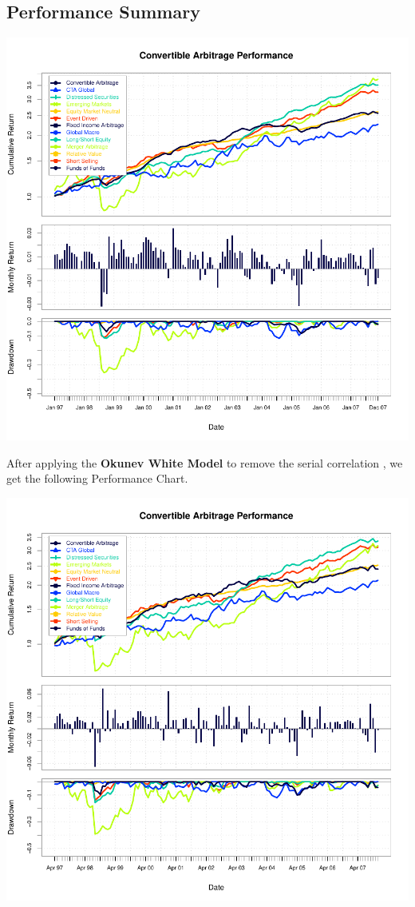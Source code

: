 \documentclass[12pt,letterpaper,english]{article}
\begin{document}
\subsection{ Performance Summary}
\includegraphics{OWReturn-003}

After applying the \textbf{Okunev White Model} to remove the serial correlation , we get the following Performance Chart.

\includegraphics{OWReturn-004}
\end{document}
